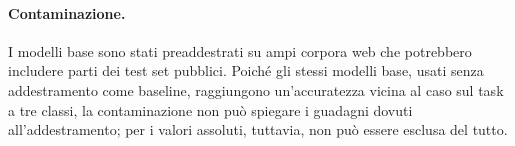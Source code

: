\paragraph{Contaminazione.} I modelli base sono stati preaddestrati su ampi corpora web che potrebbero includere parti dei
test set pubblici. Poiché gli stessi modelli base, usati senza addestramento come baseline, raggiungono un'accuratezza
vicina al caso sul task a tre classi, la contaminazione non può spiegare i guadagni dovuti all'addestramento; per i
valori assoluti, tuttavia, non può essere esclusa del tutto.
